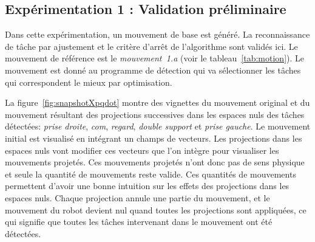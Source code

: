 \FloatBarrier
\subsection{Expérimentation 1 : Validation préliminaire}
\label{sec:prelimValid}
Dans cette expérimentation, un mouvement de base est généré.
La reconnaissance de t\^ache par ajustement et le critère d'arrêt de l'algorithme sont validés ici.
Le mouvement de référence est le \emph{mouvement~1.a} (voir le tableau~\ref{tab:motion}).
Le mouvement est donné au programme de détection qui va sélectionner
les t\^aches qui correspondent le mieux par optimisation.

La figure~\ref{fig:snapshotXpqdot} montre des vignettes du mouvement original
et du mouvement résultant des projections successives dans les espaces
nuls des t\^aches détectées:
\emph{prise droite}, \emph{com}, \emph{regard}, \emph{double support} et \emph{prise gauche}.
Le mouvement initial est visualisé en intégrant un champs de vecteurs. Les
projections dans les espaces nuls vont modifier ces vecteurs que l'on intègre pour visualiser
les mouvements projetés. Ces mouvements projetés n'ont donc pas 
de sens physique et seule la quantité de mouvements reste valide.
Ces quantités de mouvements permettent d'avoir une bonne
intuition sur les effets des projections dans les espaces nuls.
Chaque projection annule une partie du mouvement, et le mouvement du robot devient nul quand 
toutes les projections sont appliquées, ce qui signifie que toutes les t\^aches
intervenant dans le mouvement ont été détectées.
